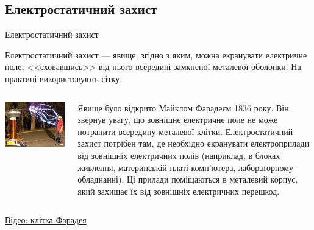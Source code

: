 \documentclass[onlytextwidth]{beamer}
\begin{document}
\subsection{Електростатичний захист}



\begin{frame}{Електростатичний захист}
	\begin{block}{}\justifying
		Електростатичний захист --- явище, згідно з яким, можна екранувати електричне поле,
		<<сховавшись>> від нього всередині замкненої металевої оболонки. На практиці
		використовують сітку.
	\end{block}
	\begin{columns}
		\begin{column}{0.49\linewidth}\centering
			\includegraphics[width=0.9\linewidth]{FaradayCage}
		\end{column}
		\begin{column}{0.5\linewidth}
			\begin{block}{}\small\justifying
				Явище було відкрито Майклом Фарадеєм 1836 року. Він звернув увагу, що зовнішнє
				електричне поле не може потрапити всередину металевої клітки. Електростатичний
				захист потрібен там, де необхідно екранувати електроприлади від зовнішніх
				електричних полів (наприклад, в блоках живлення, материнській платі комп'ютера,
				лабораторному обладнанні). Ці прилади поміщаються в металевий корпус, який захищає
				їх від зовнішніх електричних перешкод.
			\end{block}
		\end{column}
	\end{columns}
	\begin{block}{}
		\href{https://www.youtube.com/watch?v=jsBmv3-i2g0}{Відео: клітка Фарадея}
	\end{block}
\end{frame}
\end{document}
